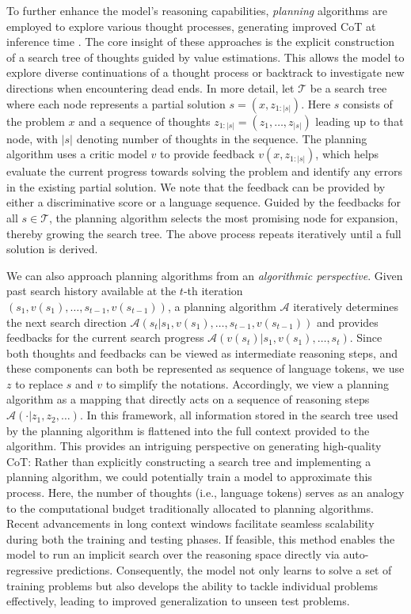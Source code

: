 \documentclass{article}
\newcommand{\citep}[1]{\parencite{#1}}
\begin{document}
To further enhance the model's reasoning capabilities, \emph{planning} algorithms are employed to explore various thought processes, generating improved CoT at inference time \citep{yao2024tree,wu2024inference,snell2024scaling}. 
The core insight of these approaches is the explicit construction of a search tree of thoughts guided by value estimations. This allows the model to explore diverse continuations of a thought process or backtrack to investigate new directions when encountering dead ends.  
In more detail, let $\mathcal{T}$ be a search tree where each node represents a partial solution $s=(x,z_{1:|s|})$. Here $s$ consists of the problem $x$ and a sequence of thoughts $z_{1:|s|} = (z_1,\dots,z_{|s|})$ leading up to that node, with $|s|$ denoting number of thoughts in the sequence.  
The planning algorithm uses a critic model $v$ to provide feedback $v(x, z_{1:|s|})$, which helps evaluate the current progress towards solving the problem and identify any errors in the existing partial solution. 
We note that the feedback can be provided by either a discriminative score or a language sequence\citep{zhang2408generative}. 
Guided by the feedbacks for all $s\in\mathcal{T}$, the planning algorithm selects the most promising node for expansion, thereby growing the search tree. The above process repeats iteratively until a full solution is derived. 

We can also approach planning algorithms from an \emph{algorithmic perspective}.
Given past search history  available at the $t$-th iteration $(s_1, v(s_1),\dots,s_{t-1}, v(s_{t-1}))$, a planning algorithm $\mathcal{A}$ iteratively determines the next search direction $\mathcal{A}(s_{t} | s_1, v(s_1), \dots, s_{t-1}, v(s_{t-1}))$ and provides feedbacks for the current search progress $\mathcal{A}(v(s_{t}) | s_1, v(s_1), \dots, s_{t})$.  
Since both thoughts and feedbacks can be viewed as intermediate reasoning steps, 
and these components can both be represented as sequence of language tokens, we use $z$ to replace $s$ and $v$ to simplify the notations. 
Accordingly, we view a planning algorithm as a mapping that directly acts on a sequence of reasoning steps $\mathcal{A}(\cdot | z_1, z_2, \dots)$. In this framework, all information stored in the search tree used by the planning algorithm is flattened into the full context provided to the algorithm.
This provides an intriguing perspective on generating high-quality CoT: Rather than explicitly constructing a search tree and implementing a planning algorithm, we could potentially train a model to approximate this process. Here, the number of thoughts (i.e., language tokens) serves as an analogy to the computational budget traditionally allocated to planning algorithms. 
Recent advancements in long context windows facilitate seamless scalability during both the training and testing phases.
If feasible, this method enables the model to run an implicit search over the reasoning space directly via auto-regressive predictions. 
Consequently, the model not only learns to solve a set of training problems but also develops the ability to tackle individual problems effectively, leading to improved generalization to unseen test problems.
\end{document}
